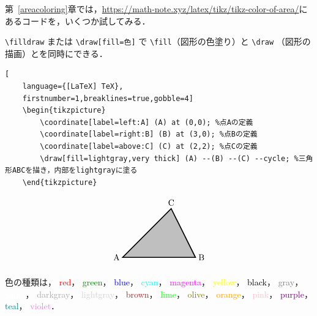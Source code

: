 \documentclass[lualatex]{jlreq}
\begin{document}
第~\ref{areacoloring}章では，\url{https://math-note.xyz/latex/tikz/tikz-color-of-area/}にあるコードを，いくつか試してみる．

\verb|\filldraw| または \verb|\draw[fill=色]| で \verb|\fill|（図形の色塗り）と \verb|\draw| （図形の描画）とを同時にできる．
\begin{lstlisting}[
    language={[LaTeX] TeX},
    firstnumber=1,breaklines=true,gobble=4]
    \begin{tikzpicture}
        \coordinate[label=left:A] (A) at (0,0); %点Aの定義
        \coordinate[label=right:B] (B) at (3,0); %点Bの定義
        \coordinate[label=above:C] (C) at (2,2); %点Cの定義
        \draw[fill=lightgray,very thick] (A) --(B) --(C) --cycle; %三角形ABCを描き，内部をlightgrayに塗る
    \end{tikzpicture}
\end{lstlisting}
\[
    \begin{tikzpicture}
        \coordinate[label=left:A] (A) at (0,0); %
        \coordinate[label=right:B] (B) at (3,0); %
        \coordinate[label=above:C] (C) at (2,2); %
        \draw[fill=lightgray,very thick] (A) --(B) --(C) --cycle; %
    \end{tikzpicture}
\]

色の種類は，
\textcolor{red}{red}，
\textcolor{green}{green}，
\textcolor{blue}{blue}，
\textcolor{cyan}{cyan}，
\textcolor{magenta}{magenta}，
\textcolor{yellow}{yellow}，
\textcolor{black}{black}，
\textcolor{gray}{gray}，
\textcolor{white}{white}，
\textcolor{darkgray}{darkgray}，
\textcolor{lightgray}{lightgray}，
\textcolor{brown}{brown}，
\textcolor{lime}{lime}，
\textcolor{olive}{olive}，
\textcolor{orange}{orange}，
\textcolor{pink}{pink}，
\textcolor{purple}{purple}，
\textcolor{teal}{teal}，
\textcolor{violet}{violet}．
\end{document}
